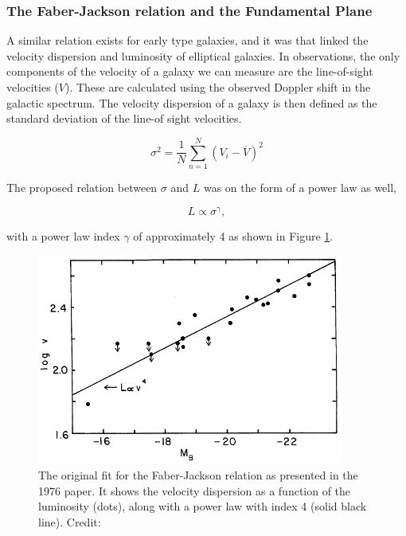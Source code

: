 \subsubsection{The Faber-Jackson relation and the Fundamental Plane}
A similar relation exists for early type galaxies, and it was \textcite{FaberJackson1976} that linked the velocity dispersion and luminosity of elliptical galaxies. In observations, the only components of the velocity of a galaxy we can measure are the line-of-sight velocities ($V$). These are calculated using the observed Doppler shift in the galactic spectrum. The velocity dispersion of a galaxy is then defined as the standard deviation of the line-of sight velocities.

\begin{equation} \label{standard_dev}
    \sigma^{2} = \frac{1}{N} \sum_{n=1}^{N} (V_{i} - \overline{V})^2
\end{equation}

The proposed relation between $\sigma$ and $L$ was on the form of a power law as well,

\begin{equation}
    L \propto \sigma^{\gamma},
\end{equation}

with a power law index $\gamma$ of approximately 4 as shown in Figure \ref{faber_jackson}.

\begin{figure}
    \centering
    \includegraphics[width=0.9\textwidth]{images/faber_jackson.png}
    \caption{The original fit for the Faber-Jackson relation as presented in the 1976 paper. It shows the velocity dispersion as a function of the luminosity (dots), along with a power law with index 4 (solid black line). Credit: \parencite{FaberJackson1976}}
    \label{faber_jackson}
\end{figure}

